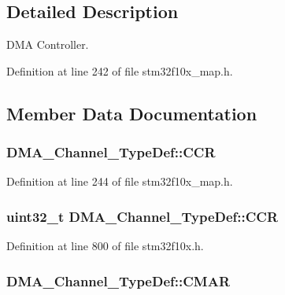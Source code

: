 \subsection{Detailed Description}
D\+MA Controller. 

Definition at line 242 of file stm32f10x\+\_\+map.\+h.



\subsection{Member Data Documentation}
\subsubsection[{\texorpdfstring{C\+CR}{CCR}}]{ D\+M\+A\+\_\+\+Channel\+\_\+\+Type\+Def\+::\+C\+CR}\hypertarget{struct_d_m_a___channel___type_def_a712f469f4ab2eeb84ed6461626f3a00f}{}\label{struct_d_m_a___channel___type_def_a712f469f4ab2eeb84ed6461626f3a00f}


Definition at line 244 of file stm32f10x\+\_\+map.\+h.

\subsubsection[{\texorpdfstring{C\+CR}{CCR}}]{ {\bf uint32\+\_\+t} D\+M\+A\+\_\+\+Channel\+\_\+\+Type\+Def\+::\+C\+CR}\hypertarget{struct_d_m_a___channel___type_def_aa4938d438293f76ff6d9a262715c23eb}{}\label{struct_d_m_a___channel___type_def_aa4938d438293f76ff6d9a262715c23eb}


Definition at line 800 of file stm32f10x.\+h.

\subsubsection[{\texorpdfstring{C\+M\+AR}{CMAR}}]{ D\+M\+A\+\_\+\+Channel\+\_\+\+Type\+Def\+::\+C\+M\+AR}\hypertarget{struct_d_m_a___channel___type_def_af2045b3622ed681023099f802c4756b4}{}\label{struct_d_m_a___channel___type_def_af2045b3622ed681023099f802c4756b4}


